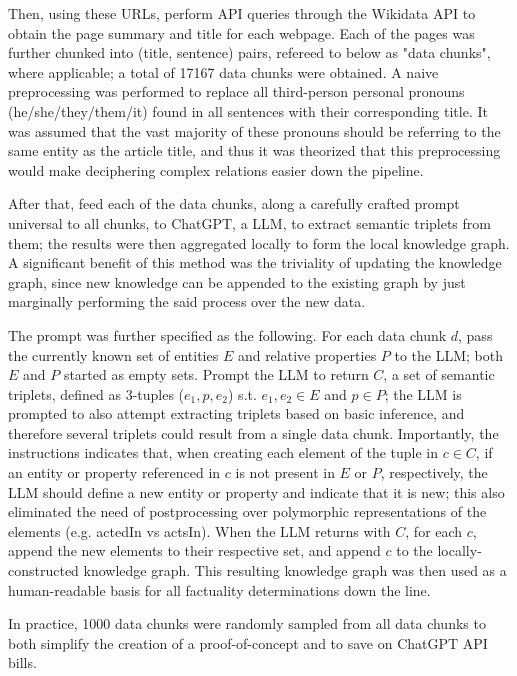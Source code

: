 \documentclass[11pt]{article}
\begin{document}
Then, using these URLs, perform API queries through the Wikidata API to obtain the page summary and title for each webpage. Each of the pages was further chunked into (title, sentence) pairs, refereed to below as "data chunks", where applicable; a total of 17167 data chunks were obtained. A naive preprocessing was performed to replace all third-person personal pronouns (he/she/they/them/it) found in all sentences with their corresponding title. It was assumed that the vast majority of these pronouns should be referring to the same entity as the article title, and thus it was theorized that this preprocessing would make deciphering complex relations easier down the pipeline.

After that, feed each of the data chunks, along a carefully crafted prompt universal to all chunks, to ChatGPT, a LLM, to extract semantic triplets from them; the results were then aggregated locally to form the local knowledge graph. A significant benefit of this method was the triviality of updating the knowledge graph, since new knowledge can be appended to the existing graph by just marginally performing the said process over the new data. 

The prompt was further specified as the following. For each data chunk $d$, pass the currently known set of entities $E$ and relative properties $P$ to the LLM; both $E$ and $P$ started as empty sets. Prompt the LLM to return $C$, a set of semantic triplets, defined as 3-tuples ($e_1, p, e_2$) s.t. $e_1, e_2 \in E$ and $p \in P$; the LLM is prompted to also attempt extracting triplets based on basic inference, and therefore several triplets could result from a single data chunk. Importantly, the instructions indicates that, when creating each element of the tuple in $c\in C$, if an entity or property referenced in $c$ is not present in $E$ or $P$, respectively, the LLM should define a new entity or property and indicate that it is new; this also eliminated the need of postprocessing over polymorphic representations of the elements (e.g. actedIn vs actsIn). When the LLM returns with $C$, for each $c$, append the new elements to their respective set, and append $c$ to the locally-constructed knowledge graph. This resulting knowledge graph was then used as a human-readable basis for all factuality determinations down the line. 

In practice, 1000 data chunks were randomly sampled from all data chunks to both simplify the creation of a proof-of-concept and to save on ChatGPT API bills. 
\end{document}
